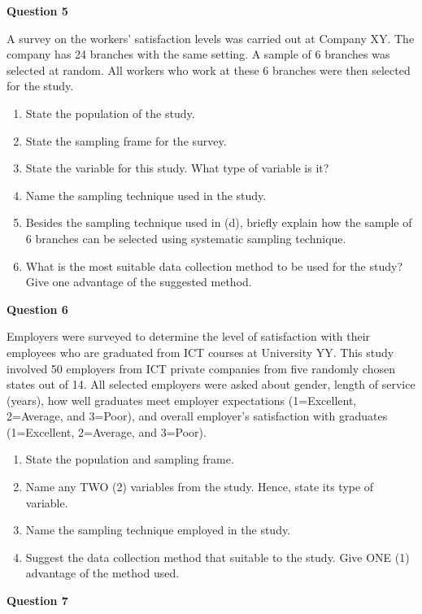 \documentclass[
  a4paper,
  DIV=11,
  numbers=noendperiod,
  oneside]{scrreprt}
\providecommand{\tightlist}{%
  \setlength{\itemsep}{0pt}\setlength{\parskip}{0pt}}\usepackage{longtable,booktabs,array}
\begin{document}
\textbf{Question 5}

A survey on the workers' satisfaction levels was carried out at Company
XY. The company has 24 branches with the same setting. A sample of 6
branches was selected at random. All workers who work at these 6
branches were then selected for the study.

\begin{enumerate}
\def\labelenumi{\alph{enumi})}
\tightlist
\item
  State the population of the study.
\item
  State the sampling frame for the survey.
\item
  State the variable for this study. What type of variable is it?
\item
  Name the sampling technique used in the study.
\item
  Besides the sampling technique used in (d), briefly explain how the
  sample of 6 branches can be selected using systematic sampling
  technique.
\item
  What is the most suitable data collection method to be used for the
  study? Give one advantage of the suggested method.
\end{enumerate}

\textbf{Question 6}

Employers were surveyed to determine the level of satisfaction with
their employees who are graduated from ICT courses at University YY.
This study involved 50 employers from ICT private companies from five
randomly chosen states out of 14. All selected employers were asked
about gender, length of service (years), how well graduates meet
employer expectations (1=Excellent, 2=Average, and 3=Poor), and overall
employer's satisfaction with graduates (1=Excellent, 2=Average, and
3=Poor).

\begin{enumerate}
\def\labelenumi{\alph{enumi})}
\tightlist
\item
  State the population and sampling frame.
\item
  Name any TWO (2) variables from the study. Hence, state its type of
  variable.
\item
  Name the sampling technique employed in the study.
\item
  Suggest the data collection method that suitable to the study. Give
  ONE (1) advantage of the method used.
\end{enumerate}

\textbf{Question 7}
\end{document}
